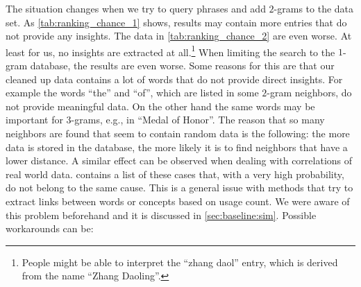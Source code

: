 The situation changes when we try to query phrases and add $2$-grams to the data set. As \autoref{tab:ranking_chance_1} shows, results may contain more entries that do not provide any insights. The data in \autoref{tab:ranking_chance_2} are even worse. At least for us, no insights are extracted at all.\footnote{People might be able to interpret the \enquote{zhang daol} entry, which is derived from the name \enquote{Zhang Daoling}.} When limiting the search to the $1$-gram database, the results are even worse. Some reasons for this are that our cleaned up data contains a lot of words that do not provide direct insights. For example the words \enquote{the} and \enquote{of}, which are listed in some $2$-gram neighbors, do not provide meaningful data. On the other hand the same words may be important for $3$-grams, e.g., in \enquote{Medal of Honor}. The reason that so many neighbors are found that seem to contain random data is the following: the more data is stored in the database, the more likely it is to find neighbors that have a lower distance. A similar effect can be observed when dealing with correlations of real world data. \cite{correlations1} contains a list of these cases that, with a very high probability, do not belong to the same cause. This is a general issue with methods that try to extract links between words or concepts based on usage count. We were aware of this problem beforehand and it is discussed in \autoref{sec:baseline:sim}. Possible workarounds can be:

